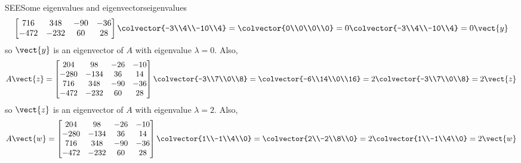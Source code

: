 \begin{example}{SEE}{Some eigenvalues and eigenvectors}{eigenvalues}
\begin{equation*}
\begin{bmatrix}
716 & 348 & -90 & -36\\ 
-472 & -232 & 60 & 28
\end{bmatrix}
\colvector{-3\\4\\-10\\4}=
\colvector{0\\0\\0\\0}=
0\colvector{-3\\4\\-10\\4}=0\vect{y}
%
\end{equation*}
%
so $\vect{y}$ is an eigenvector of $A$ with eigenvalue $\lambda=0$.  Also,
%
\begin{equation*}
A\vect{z}=
\begin{bmatrix}
204 & 98 & -26 & -10\\ 
-280 & -134 & 36 & 14\\ 
716 & 348 & -90 & -36\\ 
-472 & -232 & 60 & 28
\end{bmatrix}
\colvector{-3\\7\\0\\8}=
\colvector{-6\\14\\0\\16}=
2\colvector{-3\\7\\0\\8}=2\vect{z}
\end{equation*}
%
so $\vect{z}$ is an eigenvector of $A$ with eigenvalue $\lambda=2$.  Also,
%
\begin{equation*}
A\vect{w}=
\begin{bmatrix}
204 & 98 & -26 & -10\\ 
-280 & -134 & 36 & 14\\ 
716 & 348 & -90 & -36\\ 
-472 & -232 & 60 & 28
\end{bmatrix}
\colvector{1\\-1\\4\\0}=
\colvector{2\\-2\\8\\0}=
2\colvector{1\\-1\\4\\0}=2\vect{w}
\end{equation*}
%

\end{example}
